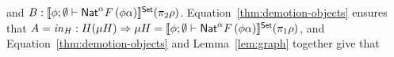 \documentclass{lmcs}
\theoremstyle{plain}\newtheorem{satz}[thm]{Satz}
\begin{document}
and $B : \llbracket{\phi; \emptyset \vdash \mathsf{Nat}^\alpha F \, (\phi
  \alpha)}\rrbracket^{\mathsf{Set}} (\pi_2 \rho)$.
Equation~\ref{thm:demotion-objects} ensures that $A = \mathit{in}_H :
H(\mu H) \Rightarrow \mu H = \llbracket{\phi;\emptyset \vdash \mathsf{Nat}^\alpha
  F \,(\phi\alpha)}\rrbracket^{\mathsf{Set}}(\pi_1\rho)$,
and Equation~\ref{thm:demotion-objects} and Lemma~\ref{lem:graph}
together give that
\end{document}
